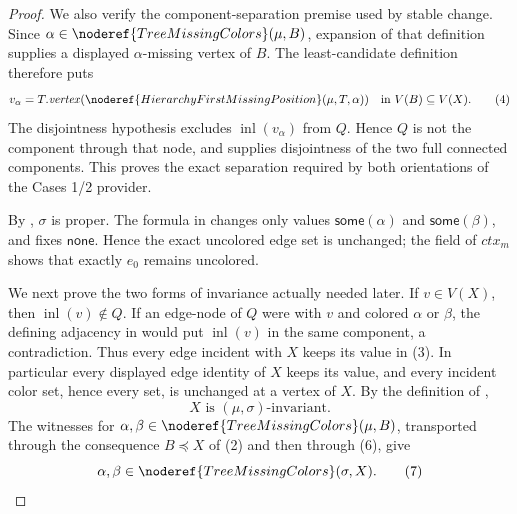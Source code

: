 \begin{proof}
We also verify the component-separation premise used by stable change.
Since \(\alpha\in\noderef{TreeMissingColors}(\mu,B)\), expansion of that
definition supplies a displayed \(\alpha\)-missing vertex of \(B\).
The least-candidate definition
 therefore puts
\[
 v_\alpha=T.\mathit{vertex}
   (\noderef{HierarchyFirstMissingPosition}(\mu,T,\alpha))
       \quad\hbox{in }V(B)\subseteq V(X).                       \tag{4}
\]
The disjointness hypothesis excludes \(\operatorname{inl}(v_\alpha)\)
from \(Q\).  Hence \(Q\) is not the component through that node, and
 supplies disjointness of the two
full connected components.  This proves the exact separation required
by both orientations of the Cases 1/2 provider.

By , \(\sigma\) is proper.  The
formula in  changes only values
\(\mathsf{some}(\alpha)\) and \(\mathsf{some}(\beta)\), and fixes
\(\mathsf{none}\).  Hence the exact uncolored edge set is unchanged;
the  field of \(\mathit{ctx}_m\) shows that
exactly \(e_0\) remains uncolored.                                  \(\tag{5}\)

We next prove the two forms of invariance actually needed later.  If
\(v\in V(X)\), then \(\operatorname{inl}(v)\notin Q\).  If an edge-node
of \(Q\) were  with \(v\) and colored \(\alpha\) or \(\beta\),
the defining adjacency in  would put
\(\operatorname{inl}(v)\) in the same component, a contradiction.
Thus every edge incident with \(X\) keeps its value in (3).  In
particular every displayed edge identity of \(X\) keeps its value, and
every incident color set, hence every
 set, is unchanged at a vertex of \(X\).  By the
definition of ,
\[
               X\text{ is }(\mu,\sigma)\text{-invariant}.       \tag{6}
\]
The witnesses for \(\alpha,\beta\in
\noderef{TreeMissingColors}(\mu,B)\), transported through the consequence
\(B\preccurlyeq X\) of (2) and then through (6), give
\[
 \alpha,\beta\in\noderef{TreeMissingColors}(\sigma,X).          \tag{7}
\]


\end{proof}
